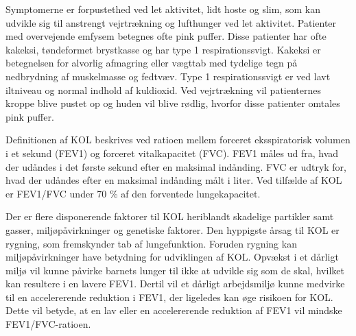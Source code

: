  
\noindent
Symptomerne er forpustethed ved let aktivitet, lidt hoste og slim, som kan udvikle sig til anstrengt vejrtrækning og lufthunger ved let aktivitet. Patienter med overvejende emfysem betegnes ofte pink puffer. Disse patienter har ofte kakeksi, tøndeformet brystkasse og har type 1 respirationssvigt. Kakeksi er betegnelsen for alvorlig afmagring eller vægttab med tydelige tegn på nedbrydning af muskelmasse og fedtvæv. Type 1 respirationssvigt er ved lavt iltniveau og normal indhold af kuldioxid. Ved vejrtrækning vil patienternes kroppe blive pustet op og huden vil blive rødlig, hvorfor disse patienter omtales pink puffer.\cite{Healthguidances2016}

Definitionen af KOL beskrives ved ratioen mellem forceret eksspiratorisk volumen i et sekund (FEV1) og forceret vitalkapacitet (FVC). FEV1 måles ud fra, hvad der udåndes i det første sekund efter en maksimal indånding. FVC er udtryk for, hvad der udåndes efter en maksimal indånding målt i liter. Ved tilfælde af KOL er FEV1/FVC under 70 \% af den forventede lungekapacitet. \cite{Basisbogen2016}

Der er flere disponerende faktorer til KOL heriblandt skadelige partikler samt gasser, miljøpåvirkninger og genetiske faktorer. Den hyppigste årsag til KOL er rygning, som fremskynder tab af lungefunktion.\cite{Basisbogen2016,Martinez2016,dsam2016} Foruden rygning kan miljøpåvirkninger have betydning for udviklingen af KOL. Opvækst i et dårligt miljø vil kunne påvirke barnets lunger til ikke at udvikle sig som de skal, hvilket kan resultere i en lavere FEV1. Dertil vil et dårligt arbejdsmiljø kunne medvirke til en accelererende reduktion i FEV1, der ligeledes kan øge risikoen for KOL. \cite{Martinez2016} Dette vil betyde, at en lav eller en accelererende reduktion af FEV1 vil mindske FEV1/FVC-ratioen.  



